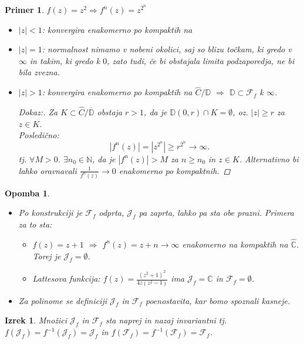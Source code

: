 \documentclass{article}
\newtheorem{opomba}{Opomba}
\newtheorem{primer}{Primer}
\newtheorem{izrek}{Izrek}
\newcommand{\C}{\mathbb{C}}
\newcommand{\D}{\mathbb{D}}
\newcommand{\N}{\mathbb{N}}
\newcommand{\F}{\mathcal{F}}
\begin{document}
\begin{primer}
$f(z) = z^2 \Longrightarrow f^n(z) = z^{2^n}$
\begin{itemize}
    \item  $|z| < 1$: konvergira enakomerno po kompaktih na 
    \item $|z| = 1$: normalnost nimamo v nobeni okolici, saj so blizu točkam, ki gredo v $\infty$ in takim, ki gredo k $0$, zato tudi, če bi obstajala limita podzaporedja, ne bi bila zvezna. 
    \item $|z| > 1$: konvergira enakomerno po kompaktih na $\hat{C}\slash\D$ $\Longrightarrow$ $\D \subset \F_f$ k $\infty$.
    \begin{proof}[Dokaz:]
    Za $K \subset \hat{C} \slash \overline{\D}$ obstaja $r > 1$, da je $\D(0, r) \cap K = \emptyset$, oz. $|z| \geq r$ za $z\in K$. \\ 
    Posledično:
    $$
    |f^n(z)| = |z^{2^n}| \geq r^{2^n} \rightarrow \infty.
    $$ 
    tj. $\forall M > 0$. $\exists n_0 \in \N$, da je $|f^n(z)| > M$ za $n \geq n_0$ in $z\in K$. Alternativno bi lahko oravnavali $\frac{1}{f^n(z)} \rightarrow 0$ enakomerno po kompaktnih. 
\end{proof}
\end{itemize}
\end{primer}


\begin{opomba}
\hfill
\begin{itemize}
\item Po konstrukciji je $\F_f$ odprta, $\mathcal{J}_f$ pa zaprta, lahko pa sta obe prazni. Primera za to sta:
\begin{itemize}
\item $f(z) = z + 1$ $\Longrightarrow$ $f^n(z) = z + n \longrightarrow \infty$ enakomerno na kompaktih na $\hat{\C}$. Torej je $\mathcal{J}_f = \emptyset$.
\item Lattesova funkcija: $f(z) = \frac{(z^2 + 1)^2}{4z(z^2 - 1)}$ ima $\mathcal{J}_f = \hat{\C}$ in $\F_f = \emptyset$.
\end{itemize}
\item Za polinome se definiciji $\mathcal{J}_f$ in $\F_f$ poenostavita, kar bomo spoznali kasneje.
\end{itemize}
\end{opomba}

\begin{izrek}
Množici $\mathcal{J}_f$ in $\F_f$ sta naprej in nazaj invariantni tj. $f(\mathcal{J}_f) = f^{-1}(\mathcal{J}_f) = \mathcal{J}_f$ in $f(\mathcal{F}_f) = f^{-1}(\mathcal{F}_f) = \mathcal{F}_f$.
\end{izrek}
\end{document}
